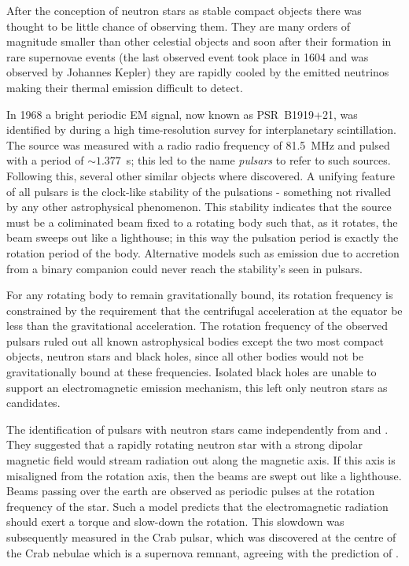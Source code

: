 After the conception of neutron stars as stable compact objects there was
thought to be little chance of observing them. They are many orders of
magnitude smaller than other celestial objects and soon after their formation
in rare supernovae events (the last observed event took place in 1604 and was
observed by Johannes Kepler) they are rapidly cooled by the emitted neutrinos
making their thermal emission difficult to detect.

In 1968 a bright periodic EM signal, now known as PSR~B1919+21, was identified
by \citet{Hewish1968} during a high time-resolution survey for interplanetary
scintillation. The source was measured with a radio radio frequency of 81.5~MHz
and pulsed with a period of $\sim 1.377$~s; this led to the name \emph{pulsars}
to refer to such sources.  Following this, several other similar objects where
discovered. A unifying feature of all pulsars is the clock-like stability of
the pulsations - something not rivalled by any other astrophysical phenomenon.
This stability indicates that the source must be a coliminated beam fixed to a
rotating body such that, as it rotates, the beam sweeps out like a lighthouse;
in this way the pulsation period is exactly the rotation period of the body.
Alternative models such as emission due to accretion from a binary companion
could never reach the stability's seen in pulsars.

For any rotating body to remain gravitationally bound, its rotation frequency is
constrained by the requirement that the centrifugal acceleration at the equator
be less than the gravitational acceleration. The rotation frequency of the observed
pulsars ruled out all known astrophysical bodies except the two most compact
objects, neutron stars and black holes, since all other bodies would not be
gravitationally bound at these frequencies. Isolated black holes are unable to
support an electromagnetic emission mechanism, this left only neutron stars
as candidates.

The identification of pulsars with neutron stars came independently from
\citet{Pacini1967} and \citet{Gold1968}. They suggested that a rapidly rotating
neutron star with a strong dipolar magnetic field would stream radiation out
along the magnetic axis. If this axis is misaligned from the rotation axis,
then the beams are swept out like a lighthouse. Beams passing over the earth
are observed as periodic pulses at the rotation frequency of the star.  Such a
model predicts that the electromagnetic radiation should exert a torque and
slow-down the rotation.  This slowdown was subsequently measured in the Crab
pulsar, which was discovered at the centre of the Crab nebulae which is a
supernova remnant, agreeing with the prediction of \citet{Baade1934}.

